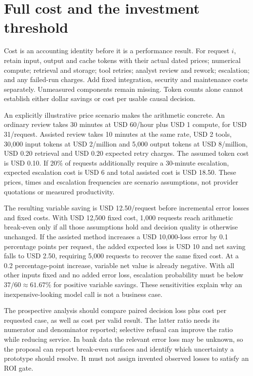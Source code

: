 \hypertarget{full-cost-and-the-investment-threshold}{%
\section{Full cost and the investment
threshold}\label{full-cost-and-the-investment-threshold}}

\label{exec14:cost-development}

Cost is an accounting identity before it is a performance result. For
request \(i\), retain input, output and cache tokens with their actual
dated prices; numerical compute; retrieval and storage; tool retries;
analyst review and rework; escalation; and any failed-run charges. Add
fixed integration, security and maintenance costs separately. Unmeasured
components remain missing. Token counts alone cannot establish either
dollar savings or cost per usable causal decision.

An explicitly illustrative price scenario makes the arithmetic concrete.
An ordinary review takes 30 minutes at USD 60/hour plus USD 1 compute,
for USD 31/request. Assisted review takes 10 minutes at the same rate,
USD 2 tools, 30,000 input tokens at USD 2/million and 5,000 output
tokens at USD 8/million, USD 0.20 retrieval and USD 0.20 expected retry
charges. The assumed token cost is USD 0.10. If 20\% of requests
additionally require a 30-minute escalation, expected escalation cost is
USD 6 and total assisted cost is USD 18.50. These prices, times and
escalation frequencies are scenario assumptions, not provider quotations
or measured productivity.

The resulting variable saving is USD 12.50/request before incremental
error losses and fixed costs. With USD 12,500 fixed cost, 1,000 requests
reach arithmetic break-even only if all those assumptions hold and
decision quality is otherwise unchanged. If the assisted method
increases a USD 10,000-loss error by 0.1 percentage points per request,
the added expected loss is USD 10 and net saving falls to USD 2.50,
requiring 5,000 requests to recover the same fixed cost. At a 0.2
percentage-point increase, variable net value is already negative. With
all other inputs fixed and no added error loss, escalation probability
must be below \(37/60\approx61.67\%\) for positive variable savings.
These sensitivities explain why an inexpensive-looking model call is not
a business case. \citep{exec14_evaluation_oracle}

The prospective analysis should compare paired decision loss plus cost
per requested case, as well as cost per valid result. The latter ratio
needs its numerator and denominator reported; selective refusal can
improve the ratio while reducing service. In bank data the relevant
error loss may be unknown, so the proposal can report break-even
surfaces and identify which uncertainty a prototype should resolve. It
must not assign invented observed losses to satisfy an ROI gate.

